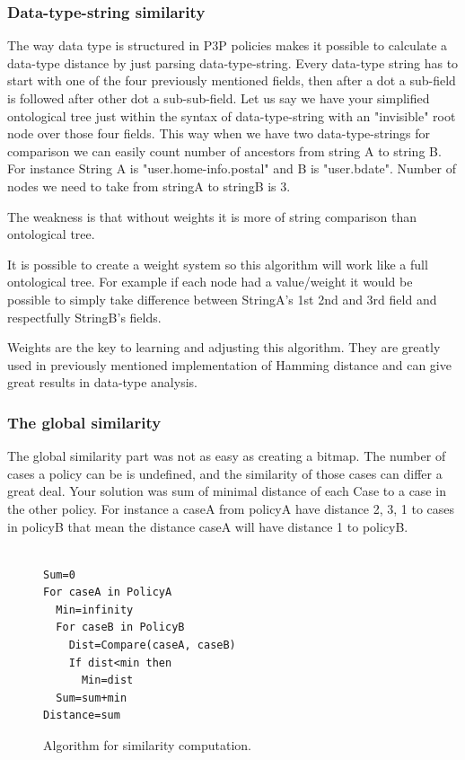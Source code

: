\subsubsection{Data-type-string similarity}
The way data type is structured in P3P policies makes it possible to calculate a data-type distance by just parsing data-type-string. Every data-type string has to start with one of the four previously mentioned fields, then after a dot a sub-field is followed after other dot a sub-sub-field. Let us say we have your simplified ontological tree just within the syntax of data-type-string with an "invisible" root node over those four fields. This way when we have two data-type-strings for comparison we can easily count number of ancestors from string A to string B. For instance String A is "user.home-info.postal" and B is "user.bdate". Number of nodes we need to take from stringA to stringB is 3. 

The weakness is that without weights it is more of string comparison than ontological tree.

It is possible to create a weight system so this algorithm will work like a full ontological tree. For example if each node had a value/weight it would be possible to simply take difference between StringA's 1st 2nd and 3rd field and respectfully StringB's fields.
 
Weights are the key to learning and adjusting this algorithm. They are greatly used in previously mentioned implementation of Hamming distance and can give great results in data-type analysis.

\subsubsection{ The global similarity }
The global similarity part was not as easy as creating a bitmap. The number of cases a policy can be is undefined, and the similarity of those cases can differ a great deal. Your solution was sum of minimal distance of each Case to a case in the other policy. For instance a caseA from policyA have distance 2, 3, 1 to cases in policyB that mean the distance caseA will have distance 1 to policyB. 

\begin{figure}[htpb]

\begin{verbatim}

Sum=0
For caseA in PolicyA
  Min=infinity
  For caseB in PolicyB
    Dist=Compare(caseA, caseB)
    If dist<min then
      Min=dist
  Sum=sum+min
Distance=sum
\end{verbatim}

  \caption{Algorithm for similarity computation.}
  \label{similAlgo}
\end{figure}
 

